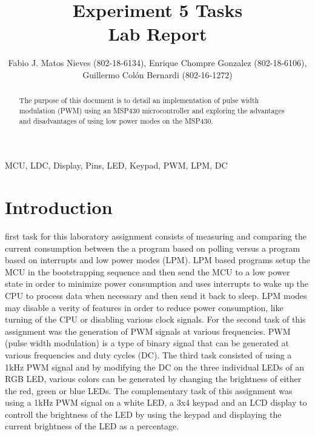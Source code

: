 \documentclass[journal]{IEEEtran}
\begin{document}
\title{Experiment 5 Tasks\\ Lab Report} \author{Fabio J. Matos
  Nieves (802-18-6134), Enrique Chompre Gonzalez (802-18-6106), \\Guillermo Colón Bernardi (802-16-1272)}
\maketitle
\begin{abstract}
  The purpose of this document is to detail an implementation of pulse width modulation (PWM) using an MSP430 microcontroller and exploring the advantages and disadvantages of using low power modes on the MSP430.
\end{abstract}
\begin{IEEEkeywords}
  MCU, LDC, Display, Pins, LED, Keypad, PWM, LPM, DC
\end{IEEEkeywords}
\IEEEpeerreviewmaketitle
\section{Introduction}
 first task for this laboratory assignment consists of measuring and comparing the current consumption between the a program based on polling versus a program based on interrupts and low power modes (LPM). LPM based programs setup the MCU in the bootstrapping sequence and then send the MCU to a low power state in order to minimize power consumption and uses interrupts to wake up the CPU to process data when necessary and then send it back to sleep. LPM modes may disable a verity of features in order to reduce power consumption, like turning of the CPU or disabling various clock signals. For the second task of this assignment was the generation of PWM signals at various frequencies. PWM (pulse width modulation) is a type of binary signal that can be generated at various frequencies and duty cycles (DC). The third task consisted of using a 1\si{kHz} PWM signal and by modifying the DC on the three individual LEDs of an RGB LED, various colors can be generated by changing the brightness of either the red, green or blue LEDs. The complementary task of this assignment was using a 1\si{kHz} PWM signal on a white LED, a 3x4 keypad and an LCD display to controll the brightness of the LED by using the keypad and displaying the current brightness of the LED as a percentage.\\
\end{document}
